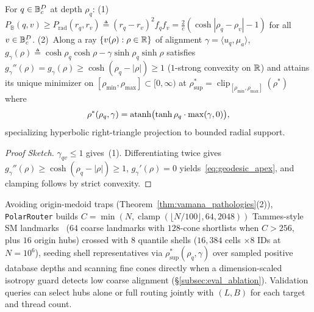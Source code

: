\begin{proposition}
\label{prop:geodesic_apex}
For $q \in \mathbb{B}_c^D$ at depth $\rho_q$:
(1)~$P_{\mathbb{B}}(q, v) \ge P_{\mathrm{rad}}(r_q, r_v) \triangleq (r_q - r_v)^2 f_q f_v = \frac{2}{c}(\cosh|\rho_q - \rho_v| - 1)$ for all $v \in \mathbb{B}_c^D$.
(2)~Along a ray $\{v(\rho) : \rho \in \mathbb{R}\}$ of alignment $\gamma = \langle u_q, \mu_a\rangle$, $g_\gamma(\rho) \triangleq \cosh\rho_q\cosh\rho - \gamma\sinh\rho_q\sinh\rho$ satisfies $g_\gamma''(\rho) = g_\gamma(\rho) \ge \cosh(\rho_q - |\rho|) \ge 1$ ($1$-strong convexity on $\mathbb{R}$) and attains its unique minimizer on $[\rho_{\min}, \rho_{\max}] \subset [0, \infty)$ at $\rho_{\mathrm{sup}}^* = \operatorname{clip}_{[\rho_{\min},\rho_{\max}]}(\rho^*)$ where
\begin{equation}
  \rho^*(\rho_q, \gamma) = \operatorname{atanh}\bigl(\tanh\rho_q \cdot \max(\gamma, 0)\bigr),
  \label{eq:geodesic_apex}
\end{equation}
specializing hyperbolic right-triangle projection to bounded radial support.
\end{proposition}
\begin{proof}[Proof Sketch]
$\gamma_{qv} \le 1$ gives~(1). Differentiating twice gives $g_\gamma''(\rho) \ge \cosh(\rho_q - |\rho|) \ge 1$, $g_\gamma'(\rho) = 0$ yields~\eqref{eq:geodesic_apex}, and clamping follows by strict convexity.
\end{proof}

Avoiding origin-medoid traps (Theorem~\ref{thm:vamana_pathologies}(2)), \texttt{PolarRouter} builds $C = \min(N, \operatorname{clamp}(\lfloor N/100\rfloor, 64, 2048))$ Tammes-style {SM} landmarks~\cite{tammes1930origin} ($64$ coarse landmarks with $128$-cone shortlists when $C > 256$, plus $16$ origin hubs) crossed with $8$ quantile shells ($16{,}384$ cells $\times 8$ IDs at $N = 10^6$), seeding shell representatives via $\rho_{\mathrm{sup}}^*(\rho_q, \gamma)$ over sampled positive database depths and scanning fine cones directly when a dimension-scaled isotropy guard detects low coarse alignment (\S\ref{subsec:eval_ablation}). Validation queries can select hubs alone or full routing jointly with $(L,B)$ for each target and thread count.
